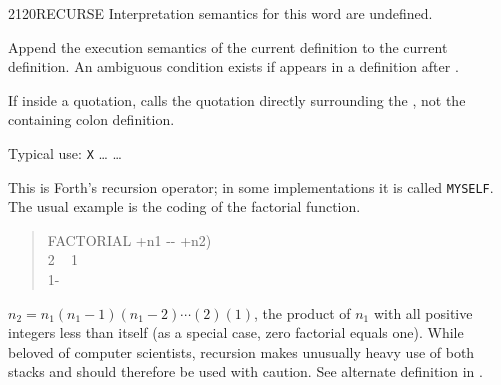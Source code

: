 \begin{worddef}{2120}{RECURSE}
\interpret
	Interpretation semantics for this word are undefined.

\compile
	\stack{}{}

	Append the execution semantics of the current definition to
	the current definition. An ambiguous condition exists if
	 appears in a definition after .

	If inside a quotation, calls the quotation directly surrounding
	the , not the containing colon definition.

	\walso{tools:[:}

	\begin{rationale} %
		Typical use:
			\word{:} \texttt{X} {\ldots}  {\ldots} \word{;}

		This is Forth's recursion operator; in some implementations it
		is called \texttt{MYSELF}. The usual example is the coding of
		the factorial function.

		\begin{quote}\ttfamily
		\word{:} FACTORIAL  +n1 -{}- +n2) \\
		\tab {} 2  ~
				 1 ~
			 \\
		\tab {} 1- ~~ \word{*} \\
		\word{;}
		\end{quote}

		$n_2 = n_1(n_1-1)(n_1-2)\cdots(2)(1)$, the product of $n_1$
		with all positive integers less than itself (as a special case,
		zero factorial equals one). While beloved of computer scientists,
		recursion makes unusually heavy use of both stacks and should
		therefore be used with caution. See alternate definition in
		.
	\end{rationale}

	\begin{testing} %
		 \\
		 \\
		 \\
		 \\
		 \\


\end{testing}
\end{worddef}
